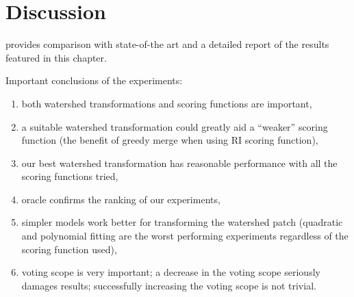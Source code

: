 \section{Discussion}

 provides comparison with state-of-the art and a detailed report of the results featured in this chapter.


Important conclusions of the experiments:
\begin{enumerate}
 \item both watershed transformations and scoring functions are important,
 \item a suitable %
 watershed transformation could greatly aid a ``weaker'' scoring function (\eg the benefit of greedy merge when using RI scoring function),
 \item our best watershed transformation has reasonable performance with all the scoring functions tried,
 \item oracle confirms the ranking of our experiments,
 \item simpler models work better for transforming the watershed patch (\eg quadratic and polynomial fitting are the worst performing experiments regardless of the scoring function used),
 \item voting scope is very important; a decrease in the voting scope seriously damages results; successfully increasing the voting scope is not trivial.
\end{enumerate}